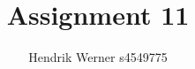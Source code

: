 \documentclass[12pt, a4paper]{article}
\title{Assignment 11}
\author{Hendrik Werner s4549775}
\begin{document}
\maketitle

\section{} %

\section{} %

\section{} %

\section{} %

\section{} %
\end{document}
